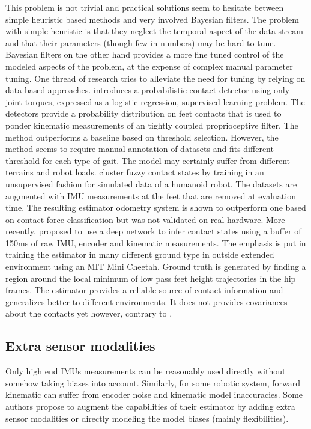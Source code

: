 This problem is not trivial and practical solutions seem to hesitate between simple heuristic based methods and very involved Bayesian filters. 
The problem with simple heuristic is that they neglect the temporal aspect of the data stream and that their parameters (though few in numbers) may be hard to tune.
Bayesian filters on the other hand provides a more fine tuned control of the modeled aspects of the problem, at the expense of complex manual parameter tuning.
One thread of research tries to alleviate the need for tuning by relying on data based approaches. \cite{camurri2017probabilistic} introduces a probabilistic 
contact detector using only joint torques, expressed as a logistic regression, supervised learning problem. The detectors provide a probability distribution on feet contacts that is used to ponder kinematic
measurements of an tightly coupled proprioceptive filter. The method outperforms a baseline based on threshold selection. However, the method seems to require manual annotation of datasets and 
fits different threshold for each type of gait. The model may certainly suffer from different terrains and robot loads. 
\cite{rotella2018unsupervised} cluster fuzzy contact states by training in an unsupervised fashion for simulated data of a humanoid robot. The datasets are augmented
with IMU measurements at the feet that are removed at evaluation time. The resulting estimator odometry system is shown to outperform one based on contact force classification
but was not validated on real hardware. More recently, \cite{lin2021deep} proposed to use a deep network to infer contact states using a buffer of 150ms of raw IMU, 
encoder and kinematic measurements. The emphasis is put in training the estimator in many different ground type in outside extended environment using an MIT Mini Cheetah. Ground truth is generated
by finding a region around the local minimum of low pass feet height trajectories in the hip frames. The estimator provides a reliable source of contact information 
and generalizes better to different environments. It does not provides covariances about the contacts yet however, contrary to \cite{camurri2017probabilistic}.  



\subsection{Extra sensor modalities}
Only high end IMUs measurements can be reasonably used directly without somehow taking biases into account.
Similarly, for some robotic system, forward kinematic can suffer from encoder noise and kinematic model inaccuracies. Some authors propose to 
augment the capabilities of their estimator by adding extra sensor modalities or directly modeling the model biases (mainly flexibilities).

